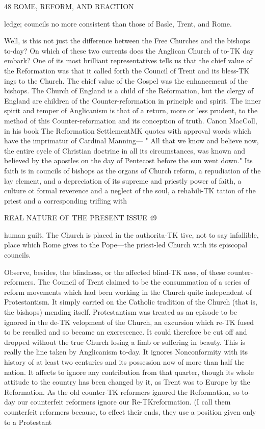 \documentclass[12pt,a5paper,oneside]{book}
\begin{document}
48 ROME, REFORM, AND REACTION 

ledge; councils no more consistent than those of 
Basle, Trent, and Rome. 

Well, is this not just the difference between the 
Free Churches and the bishops to-day? On which of 
these two currents does the Anglican Church of to-TK
day embark? One of its most brilliant representatives 
tells us that the chief value of the Reformation was 
that it called forth the Council of Trent and its bless-TK
ings to the Church. The chief value of the Gospel 
was the enhancement of the bishops. The Church of 
England is a child of the Reformation, but the clergy 
of England are children of the Counter-reformation in 
principle and spirit. The inner spirit and temper of 
Anglicanism is that of a return, more or less prudent, 
to the method of this Counter-reformation and its 
conception of truth. Canon MacColl, in his book 
The Reformation SettlementMK quotes with approval words 
which have the imprimatur of Cardinal Manning---
" All that we know and believe now, the entire cycle 
of Christian doctrine in all its circumstances, was 
known and believed by the apostles on the day of 
Pentecost before the sun went down." Its faith is in 
councils of bishops as the organs of Church reform, a 
repudiation of the lay element, and a depreciation of 
its supreme and priestly power of faith, a culture ot 
formal reverence and a neglect of the soul, a rehabili-TK
tation of the priest and a corresponding trifling with 



REAL NATURE OF THE PRESENT ISSUE 49 

human guilt. The Church is placed in the authorita-TK
tive, not to say infallible, place which Rome gives to 
the Pope---the priest-led Church with its episcopal 
councils. 

Observe, besides, the blindness, or the affected blind-TK
ness, of these counter-reformers. The Council of 
Trent claimed to be the consummation of a series of 
reform movements which had been working in the 
Church quite independent of Protestantism. It 
simply carried on the Catholic tradition of the Church 
(that is, the bishops) mending itself. Protestantism 
was treated as an episode to be ignored in the de-TK
velopment of the Church, an excursion which re-TK
fused to be recalled and so became an excrescence. 
It could therefore be cut off and dropped without the 
true Church losing a limb or suffering in beauty. 
This is really the line taken by Anglicanism to-day. It 
ignores Nonconformity with its history of at least two 
centuries and its possession now of more than half 
the nation. It affects to ignore any contribution 
from that quarter, though its whole attitude to the 
country has been changed by it, as Trent was to 
Europe by the Reformation. As the old counter-TK
reformers ignored the Reformation, so to-day our 
counterfeit reformers ignore our Re-TKreformation. (I 
call them counterfeit reformers because, to effect their 
ends, they use a position given only to a Protestant 
\end{document}
